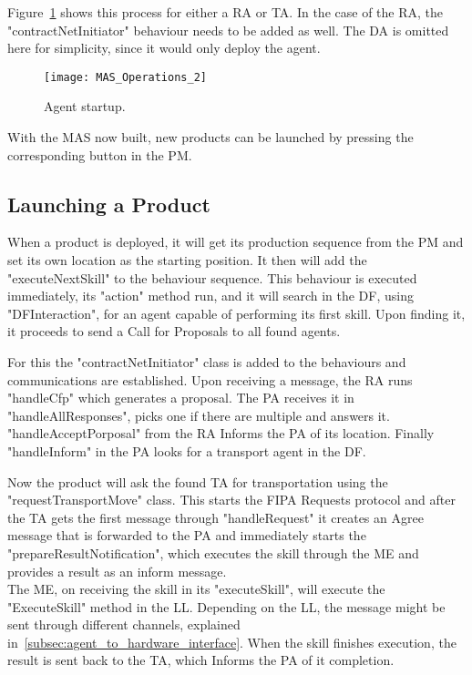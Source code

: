 Figure~\ref{fig:mas_operations_2} shows this process for either a \acrlong{RA} or \acrlong{TA}. In the case of the \acrshort{RA}, the "contractNetInitiator" behaviour needs to be added as well. The \acrshort{DA} is omitted here for simplicity, since it would only deploy the agent.\\

\begin{figure}[h!]
	\centering
	\texttt{[image: MAS\_Operations\_2]}
	\caption{Agent startup.}
	\label{fig:mas_operations_2}
\end{figure}

With the \acrshort{MAS} now built, new products can be launched by pressing the corresponding button in the \acrshort{PM}.

\subsection{Launching a Product}

When a product is deployed, it will get its production sequence from the \acrshort{PM} and set its own location as the starting position. It then will add the "executeNextSkill" to the behaviour sequence. This behaviour is executed immediately, its "action" method run, and it will search in the \acrshort{DF}, using "DFInteraction", for an agent capable of performing its first skill. Upon finding it, it proceeds to send a Call for Proposals to all found agents.

For this the "contractNetInitiator" class is added to the behaviours and communications are established. Upon receiving a message, the \acrshort{RA} runs "handleCfp" which generates a proposal. The \acrshort{PA} receives it in "handleAllResponses", picks one if there are multiple and answers it. "handleAcceptPorposal" from the \acrshort{RA} Informs the \acrshort{PA} of its location. Finally "handleInform" in the \acrshort{PA} looks for a transport agent in the \acrshort{DF}.

Now the product will ask the found \acrshort{TA} for transportation using the "requestTransportMove" class. This starts the \acrshort{FIPA} Requests protocol and after the \acrshort{TA} gets the first message through "handleRequest" it creates an Agree message that is forwarded to the \acrshort{PA} and immediately starts the "prepareResultNotification", which executes the skill through the \acrshort{ME} and provides a result as an inform message.\\

The \acrlong{ME}, on receiving the skill in its "executeSkill", will execute the "ExecuteSkill" method in the \acrshort{LL}. Depending on the \acrlong{LL}, the message might be sent through different channels, explained in~\ref{subsec:agent_to_hardware_interface}. When the skill finishes execution, the result is sent back to the \acrshort{TA}, which Informs the \acrshort{PA} of it completion.\\

